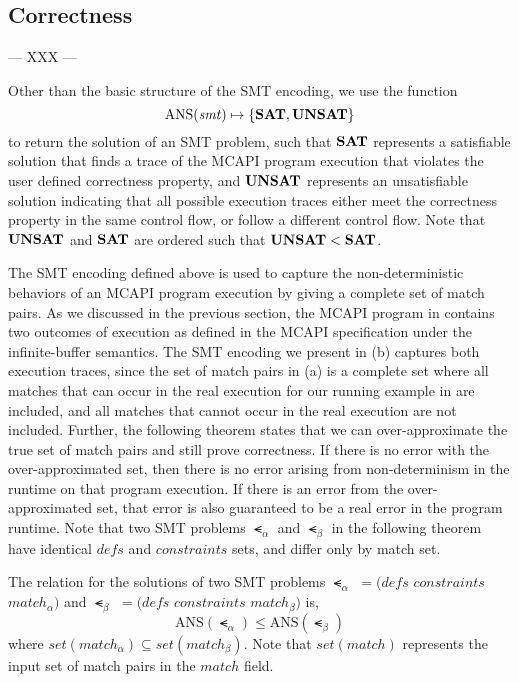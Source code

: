 \subsection{Correctness}

--- XXX ---

Other than the basic structure of the SMT encoding, we use the
function
\[\mathrm{ANS}(\mathit{smt}) \mapsto \{\mathrm{\textbf{SAT}},\mathrm{\textbf{UNSAT}}\} \]
to return the solution of an SMT problem, such that
$\mathrm{\textbf{SAT}}$ represents a satisfiable solution that finds a
trace of the MCAPI program execution that violates the user defined
correctness property, and $\mathrm{\textbf{UNSAT}}$ represents an
unsatisfiable solution indicating that all possible execution traces
either meet the correctness property in the same control flow, or
follow a different control flow. Note that $\mathrm{\textbf{UNSAT}}$ and
$\mathrm{\textbf{SAT}}$ are ordered such that $\mathrm{\textbf{UNSAT}} <
\mathrm{\textbf{SAT}}$.

The SMT encoding defined above is used to capture the
non-deterministic behaviors of an MCAPI program execution by giving a
complete set of match pairs. As we discussed in the previous section,
the MCAPI program in  contains two outcomes of
execution as defined in the MCAPI specification under the
infinite-buffer semantics. The SMT encoding we present in
(b) captures both execution traces, since the set of
match pairs in (a) is a complete set where all matches
that can occur in the real execution for our running example in
 are included, and all matches that cannot occur in
the real execution are not included. Further, the following theorem
states that we can over-approximate the true set of match pairs and
still prove correctness. If there is no error with the
over-approximated set, then there is no error arising from
non-determinism in the runtime on that program execution. If there is
an error from the over-approximated set, that error is also guaranteed
to be a real error in the program runtime. Note that two SMT problems
$\smt_{\alpha}$ and $\smt_{\beta}$ in the following theorem have
identical $\mathit{defs}$ and $\mathit{constraints}$ sets, and differ
only by match set.

\begin{theorem}
The relation for the solutions of two SMT problems $\smt_{\alpha}$ $= (\mathit{defs}$ $\mathit{constraints}$ $\mathit{match}_{\alpha})$ and $\smt_{\beta}$ $= (\mathit{defs}$ $\mathit{constraints}$ $\mathit{match_{\beta}})$ is,
\[\mathrm{ANS}(\smt_{\alpha}) \leq \mathrm{ANS}(\smt_{\beta})\]
where $\mathit{set(match_{\alpha})} \subseteq \mathit{set(match_{\beta})}$. Note that $\mathit{set(match)}$ represents the input set of match pairs in the $\mathit{match}$ field.
\label{thm:1}
\end{theorem}

